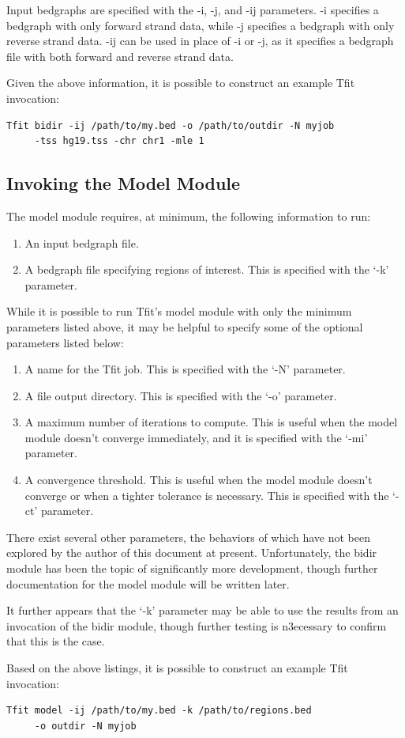 \documentclass[12pt,letterpaper]{article}
\begin{document}
Input bedgraphs are specified with the -i, -j, and -ij parameters. -i specifies a bedgraph with only forward strand data, while -j specifies a bedgraph with only reverse strand data. -ij can be used in place of -i or -j, as it specifies a bedgraph file with both forward and reverse strand data.

Given the above information, it is possible to construct an example Tfit invocation:
\begin{lstlisting}
Tfit bidir -ij /path/to/my.bed -o /path/to/outdir -N myjob 
     -tss hg19.tss -chr chr1 -mle 1
\end{lstlisting}

\subsection{Invoking the Model Module}
The model module requires, at minimum, the following information to run:
\begin{enumerate}
\item An input bedgraph file.
\item A bedgraph file specifying regions of interest. This is specified with the `-k' parameter.
\end{enumerate}

While it is possible to run Tfit's model module with only the minimum parameters listed above, it may be helpful to specify some of the optional parameters listed below:

\begin{enumerate}
\item A name for the Tfit job. This is specified with the `-N' parameter.
\item A file output directory. This is specified with the `-o' parameter.
\item A maximum number of iterations to compute. This is useful when the model module doesn't converge immediately, and it is specified with the `-mi' parameter.
\item A convergence threshold. This is useful when the model module doesn't converge or when a tighter tolerance is necessary. This is specified with the `-ct' parameter.
\end{enumerate}

There exist several other parameters, the behaviors of which have not been explored by the author of this document at present. Unfortunately, the bidir module has been the topic of significantly more development, though further documentation for the model module will be written later. 

It further appears that the `-k' parameter may be able to use the results from an invocation of the bidir module, though further testing is n3ecessary to confirm that this is the case.

Based on the above listings, it is possible to construct an example Tfit invocation:
\begin{lstlisting}
Tfit model -ij /path/to/my.bed -k /path/to/regions.bed 
     -o outdir -N myjob
\end{lstlisting}
\end{document}
